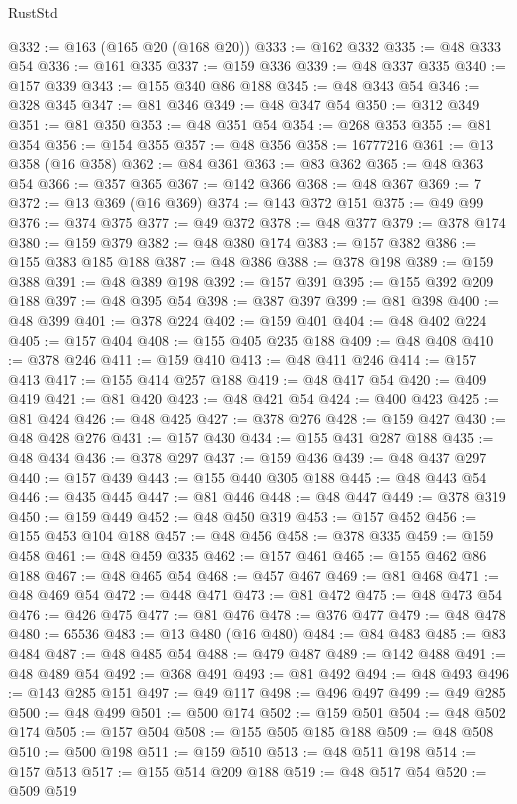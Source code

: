 \begin{lexlean}{RustStd}
\begin{coremodule}
{\begin{coremodule}
{{{{{@332 := @163 (@165 @20 (@168 @20))
@333 := @162 @332
@335 := @48 @333 @54
@336 := @161 @335
@337 := @159 @336
@339 := @48 @337 @335
@340 := @157 @339
@343 := @155 @340 @86 @188
@345 := @48 @343 @54
@346 := @328 @345
@347 := @81 @346
@349 := @48 @347 @54
@350 := @312 @349
@351 := @81 @350
@353 := @48 @351 @54
@354 := @268 @353
@355 := @81 @354
@356 := @154 @355
@357 := @48 @356
@358 := 16777216
@361 := @13 @358 (@16 @358)
@362 := @84 @361
@363 := @83 @362
@365 := @48 @363 @54
@366 := @357 @365
@367 := @142 @366
@368 := @48 @367
@369 := 7
@372 := @13 @369 (@16 @369)
@374 := @143 @372 @151
@375 := @49 @99
@376 := @374 @375
@377 := @49 @372
@378 := @48 @377
@379 := @378 @174
@380 := @159 @379
@382 := @48 @380 @174
@383 := @157 @382
@386 := @155 @383 @185 @188
@387 := @48 @386
@388 := @378 @198
@389 := @159 @388
@391 := @48 @389 @198
@392 := @157 @391
@395 := @155 @392 @209 @188
@397 := @48 @395 @54
@398 := @387 @397
@399 := @81 @398
@400 := @48 @399
@401 := @378 @224
@402 := @159 @401
@404 := @48 @402 @224
@405 := @157 @404
@408 := @155 @405 @235 @188
@409 := @48 @408
@410 := @378 @246
@411 := @159 @410
@413 := @48 @411 @246
@414 := @157 @413
@417 := @155 @414 @257 @188
@419 := @48 @417 @54
@420 := @409 @419
@421 := @81 @420
@423 := @48 @421 @54
@424 := @400 @423
@425 := @81 @424
@426 := @48 @425
@427 := @378 @276
@428 := @159 @427
@430 := @48 @428 @276
@431 := @157 @430
@434 := @155 @431 @287 @188
@435 := @48 @434
@436 := @378 @297
@437 := @159 @436
@439 := @48 @437 @297
@440 := @157 @439
@443 := @155 @440 @305 @188
@445 := @48 @443 @54
@446 := @435 @445
@447 := @81 @446
@448 := @48 @447
@449 := @378 @319
@450 := @159 @449
@452 := @48 @450 @319
@453 := @157 @452
@456 := @155 @453 @104 @188
@457 := @48 @456
@458 := @378 @335
@459 := @159 @458
@461 := @48 @459 @335
@462 := @157 @461
@465 := @155 @462 @86 @188
@467 := @48 @465 @54
@468 := @457 @467
@469 := @81 @468
@471 := @48 @469 @54
@472 := @448 @471
@473 := @81 @472
@475 := @48 @473 @54
@476 := @426 @475
@477 := @81 @476
@478 := @376 @477
@479 := @48 @478
@480 := 65536
@483 := @13 @480 (@16 @480)
@484 := @84 @483
@485 := @83 @484
@487 := @48 @485 @54
@488 := @479 @487
@489 := @142 @488
@491 := @48 @489 @54
@492 := @368 @491
@493 := @81 @492
@494 := @48 @493
@496 := @143 @285 @151
@497 := @49 @117
@498 := @496 @497
@499 := @49 @285
@500 := @48 @499
@501 := @500 @174
@502 := @159 @501
@504 := @48 @502 @174
@505 := @157 @504
@508 := @155 @505 @185 @188
@509 := @48 @508
@510 := @500 @198
@511 := @159 @510
@513 := @48 @511 @198
@514 := @157 @513
@517 := @155 @514 @209 @188
@519 := @48 @517 @54
@520 := @509 @519
}}}}}
\end{coremodule}}
\end{coremodule}
\end{lexlean}
